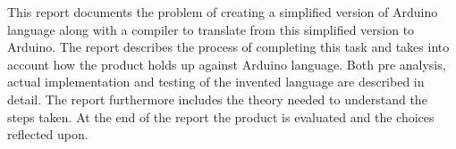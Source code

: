 This report documents the problem of creating a simplified version of Arduino language along with a compiler to translate from this simplified version to Arduino. The report describes the process of completing this task and takes into account how the product holds up against Arduino language. Both pre analysis, actual implementation and testing of the invented language are described in detail. The report furthermore includes the theory needed to understand the steps taken. At the end of the report the product is evaluated and the choices reflected upon.